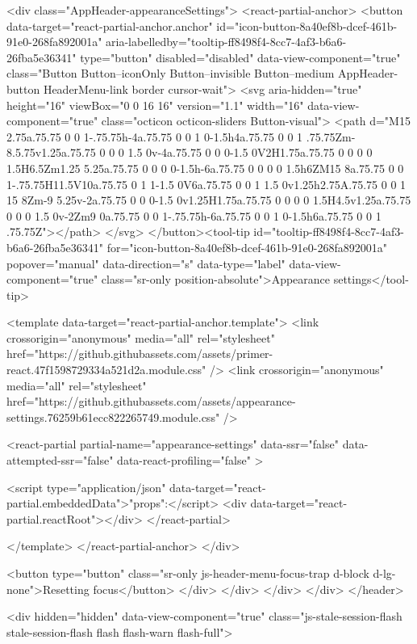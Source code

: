                 <div class="AppHeader-appearanceSettings">
    <react-partial-anchor>
      <button data-target="react-partial-anchor.anchor" id="icon-button-8a40ef8b-dcef-461b-91e0-268fa892001a" aria-labelledby="tooltip-ff8498f4-8cc7-4af3-b6a6-26fba5e36341" type="button" disabled="disabled" data-view-component="true" class="Button Button--iconOnly Button--invisible Button--medium AppHeader-button HeaderMenu-link border cursor-wait">  <svg aria-hidden="true" height="16" viewBox="0 0 16 16" version="1.1" width="16" data-view-component="true" class="octicon octicon-sliders Button-visual">
    <path d="M15 2.75a.75.75 0 0 1-.75.75h-4a.75.75 0 0 1 0-1.5h4a.75.75 0 0 1 .75.75Zm-8.5.75v1.25a.75.75 0 0 0 1.5 0v-4a.75.75 0 0 0-1.5 0V2H1.75a.75.75 0 0 0 0 1.5H6.5Zm1.25 5.25a.75.75 0 0 0 0-1.5h-6a.75.75 0 0 0 0 1.5h6ZM15 8a.75.75 0 0 1-.75.75H11.5V10a.75.75 0 1 1-1.5 0V6a.75.75 0 0 1 1.5 0v1.25h2.75A.75.75 0 0 1 15 8Zm-9 5.25v-2a.75.75 0 0 0-1.5 0v1.25H1.75a.75.75 0 0 0 0 1.5H4.5v1.25a.75.75 0 0 0 1.5 0v-2Zm9 0a.75.75 0 0 1-.75.75h-6a.75.75 0 0 1 0-1.5h6a.75.75 0 0 1 .75.75Z"></path>
</svg>
</button><tool-tip id="tooltip-ff8498f4-8cc7-4af3-b6a6-26fba5e36341" for="icon-button-8a40ef8b-dcef-461b-91e0-268fa892001a" popover="manual" data-direction="s" data-type="label" data-view-component="true" class="sr-only position-absolute">Appearance settings</tool-tip>

      <template data-target="react-partial-anchor.template">
        <link crossorigin="anonymous" media="all" rel="stylesheet" href="https://github.githubassets.com/assets/primer-react.47f1598729334a521d2a.module.css" />
<link crossorigin="anonymous" media="all" rel="stylesheet" href="https://github.githubassets.com/assets/appearance-settings.76259b61ecc822265749.module.css" />

<react-partial
  partial-name="appearance-settings"
  data-ssr="false"
  data-attempted-ssr="false"
  data-react-profiling="false"
>
  
  <script type="application/json" data-target="react-partial.embeddedData">{"props":{}}</script>
  <div data-target="react-partial.reactRoot"></div>
</react-partial>

      </template>
    </react-partial-anchor>
  </div>

          <button type="button" class="sr-only js-header-menu-focus-trap d-block d-lg-none">Resetting focus</button>
        </div>
      </div>
    </div>
  </div>
</header>

      <div hidden="hidden" data-view-component="true" class="js-stale-session-flash stale-session-flash flash flash-warn flash-full">
  
